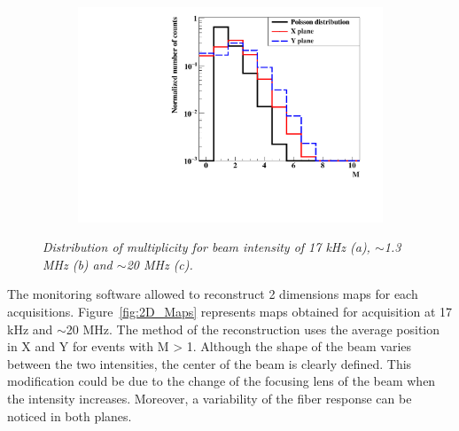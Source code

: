 \documentclass[a4paper,11pt]{article}
\begin{document}
\begin{figure}[H]
\begin{subfigure}{0.3\textwidth}
    \end{subfigure}
    ~
    \begin{subfigure}{0.3\textwidth} \centering \includegraphics[width=\textwidth]{figures/Involved_fibers_20MHz_without_X=0.pdf} \caption{} \label{fig:Fibers_20MHz}
    \end{subfigure}
\caption{\small{\textit{Distribution of multiplicity for beam intensity of 17 kHz (a), $\sim$1.3 MHz (b) and $\sim$20 MHz (c).}}}
\label{fig:Multiplicity}
\end{figure}

The monitoring software allowed to reconstruct 2 dimensions maps for each acquisitions. Figure~\ref{fig:2D_Maps} represents maps obtained for acquisition at 17 kHz and $\sim$20 MHz. The method of the reconstruction uses the  average position in X and Y for events with M > 1. Although the shape of the beam varies between the two intensities, the center of the beam is clearly defined. This modification could be due to the change of the focusing lens of the beam when the intensity increases. Moreover, a variability of the fiber response can be noticed in both planes.
\end{document}
